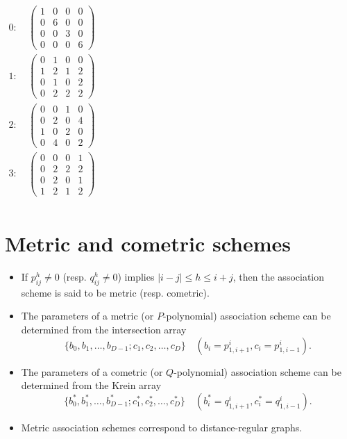\documentclass[11pt]{article}
\renewcommand{\textbf}[1]{\textcolor[rgb]{1,0,0}{{#1}}}
\renewcommand{\emph}[1]{\textcolor[rgb]{0,0,1}{{#1}}}
\renewcommand{\sout}[1]{\textcolor[rgb]{0,0.5,0}{{#1}}}
\newcommand{\prompt}[4]{
        {\ttfamily\llap{{\color{#2}[#3]:\hspace{3pt}#4}}\vspace{-\baselineskip}}
    }
\begin{document}
            
\prompt{Out}{outcolor}{2}{}
    
    \begin{math}
\newcommand{\Bold}[1]{\mathbf{#1}}\begin{aligned}0: &\ \left(\begin{array}{rrrr}
1 & 0 & 0 & 0 \\
0 & 6 & 0 & 0 \\
0 & 0 & 3 & 0 \\
0 & 0 & 0 & 6
\end{array}\right) \\
1: &\ \left(\begin{array}{rrrr}
0 & 1 & 0 & 0 \\
1 & 2 & 1 & 2 \\
0 & 1 & 0 & 2 \\
0 & 2 & 2 & 2
\end{array}\right) \\
2: &\ \left(\begin{array}{rrrr}
0 & 0 & 1 & 0 \\
0 & 2 & 0 & 4 \\
1 & 0 & 2 & 0 \\
0 & 4 & 0 & 2
\end{array}\right) \\
3: &\ \left(\begin{array}{rrrr}
0 & 0 & 0 & 1 \\
0 & 2 & 2 & 2 \\
0 & 2 & 0 & 1 \\
1 & 2 & 1 & 2
\end{array}\right) \\\end{aligned}
\end{math}

    

    \hypertarget{metric-and-cometric-schemes}{%
\section*{Metric and cometric
schemes}\label{metric-and-cometric-schemes}}

\begin{itemize}
\item
  If \textbf{\(p^h_{ij} \ne 0\)} (resp. \textbf{\(q^h_{ij} \ne 0\)})
  implies \textbf{\(|i-j| \le h \le i+j\)}, then the association scheme
  is said to be \textbf{metric} (resp. \textbf{cometric}).
\item
  The \emph{parameters} of a \emph{metric} (or
  \textbf{\(P\)-polynomial}) association scheme can be \sout{determined}
  from the \textbf{intersection array} \emph{\[
  \{b_0, b_1, \dots, b_{D-1}; c_1, c_2, \dots, c_D\}
  \quad (b_i = p^i_{1,i+1}, c_i = p^i_{1,i-1}).
  \]}
\item
  The \emph{parameters} of a \emph{cometric} (or
  \textbf{\(Q\)-polynomial}) association scheme can be \sout{determined}
  from the \textbf{Krein array} \emph{\[
  \{b^*_0, b^*_1, \dots, b^*_{D-1}; c^*_1, c^*_2, \dots, c^*_D\}
  \quad (b^*_i = q^i_{1,i+1}, c^*_i = q^i_{1,i-1}).
  \]}
\item
  \emph{Metric} association schemes correspond to \emph{distance-regular
  graphs}.
\end{itemize}
\end{document}
